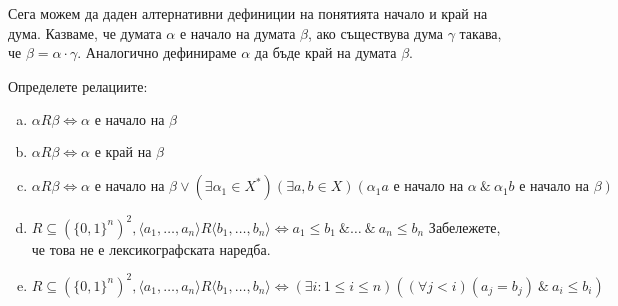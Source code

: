 Сега можем да даден алтернативни дефиниции на понятията начало и край на дума.
Казваме, че думата $\alpha$ е начало на думата $\beta$, ако съществува дума $\gamma$ такава, че
$\beta = \alpha\cdot\gamma$.
Аналогично дефинираме $\alpha$ да бъде край на думата $\beta$.


\begin{problem}
  Определете релациите:
  \begin{enumerate}[a)]
  \item
    $\alpha R \beta \iff \alpha \mbox{ е начало на }\beta$ 
  \item
    $\alpha R \beta \iff \alpha \mbox{ е край на }\beta$
  \item
    $\alpha R \beta \iff \alpha \mbox{ е начало на }\beta \vee (\exists\alpha_1\in X^{*})(\exists a,b\in X)(\alpha_1 a \mbox{ е начало на }\alpha\ \&\ \alpha_1 b \mbox{ е начало на } \beta)$
  \item
    $R\subseteq (\{0,1\}^{n})^{2}, \langle{a_1,\dots,a_n}\rangle R \langle{b_1,\dots,b_n}\rangle \iff a_1\leq b_1\ \&\dots\ \&\ a_n\leq b_n$
    Забележете, че това не е лексикографската наредба.
  \item
    $R\subseteq (\{0,1\}^{n})^{2}, \langle{a_1,\dots,a_n}\rangle R \langle{b_1,\dots,b_n}\rangle \iff (\exists i : 1\leq i\leq n)((\forall j < i)(a_j = b_j)\ \&\ a_i \leq b_i)$
\end{enumerate}
\end{problem}
